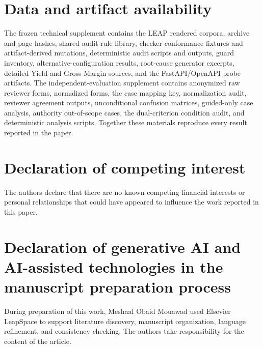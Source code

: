 \documentclass[a4paper,fleqn]{cas-dc}
\begin{document}
\section*{Data and artifact availability}
The frozen technical supplement contains the LEAP rendered corpora, archive and page hashes, shared audit-rule library, checker-conformance fixtures and artifact-derived mutations, deterministic audit scripts and outputs, guard inventory, alternative-configuration results, root-cause generator excerpts, detailed Yield and Gross Margin sources, and the FastAPI/OpenAPI probe artifacts. The independent-evaluation supplement contains anonymized raw reviewer forms, normalized forms, the case mapping key, normalization audit, reviewer agreement outputs, unconditional confusion matrices, guided-only case analysis, authority out-of-scope cases, the dual-criterion condition audit, and deterministic analysis scripts. Together these materials reproduce every result reported in the paper.

\section*{Declaration of competing interest}
The authors declare that there are no known competing financial interests or personal relationships that could have appeared to influence the work reported in this paper.

\section*{Declaration of generative AI and AI-assisted technologies in the manuscript preparation process}
During preparation of this work, Meshaal Obaid Mouawad used Elsevier LeapSpace to support literature discovery, manuscript organization, language refinement, and consistency checking. The authors take responsibility for the content of the article.



\end{document}
